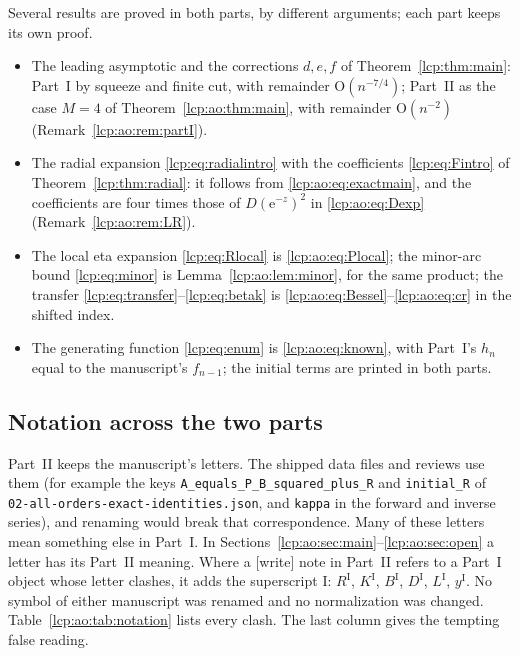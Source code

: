 \documentclass[11pt]{article}
\numberwithin{equation}{section}
\theoremstyle{definition}\newtheorem{definition}[theorem]{Definition}
\theoremstyle{remark}\newtheorem{remark}[theorem]{Remark}
\newcommand{\OO}{\mathrm O}
\newcommand{\ee}{\mathrm e}
\begin{document}
Several results are proved in both parts, by different arguments; each
part keeps its own proof.
\begin{itemize}[leftmargin=*,itemsep=0.15em]
\item The leading asymptotic and the corrections $d,e,f$ of
 Theorem~\ref{lcp:thm:main}: Part~I by squeeze and finite cut, with
 remainder $\OO(n^{-7/4})$; Part~II as the case $M=4$ of
 Theorem~\ref{lcp:ao:thm:main}, with remainder $\OO(n^{-2})$
 (Remark~\ref{lcp:ao:rem:partI}).
\item The radial expansion \eqref{lcp:eq:radialintro} with the
 coefficients \eqref{lcp:eq:Fintro} of Theorem~\ref{lcp:thm:radial}: it
 follows from \eqref{lcp:ao:eq:exactmain}, and the coefficients are four
 times those of $D(\ee^{-z})^2$ in \eqref{lcp:ao:eq:Dexp}
 (Remark~\ref{lcp:ao:rem:LR}).
\item The local eta expansion \eqref{lcp:eq:Rlocal} is
 \eqref{lcp:ao:eq:Plocal}; the minor-arc bound \eqref{lcp:eq:minor} is
 Lemma~\ref{lcp:ao:lem:minor}, for the same product; the transfer
 \eqref{lcp:eq:transfer}--\eqref{lcp:eq:betak} is
 \eqref{lcp:ao:eq:Bessel}--\eqref{lcp:ao:eq:cr} in the shifted index.
\item The generating function \eqref{lcp:eq:enum} is
 \eqref{lcp:ao:eq:known}, with Part~I's $h_n$ equal to the manuscript's
 $f_{n-1}$; the initial terms are printed in both parts.
\end{itemize}

\subsection{Notation across the two parts}\label{lcp:ao:sec:notation}
Part~II keeps the manuscript's letters. The shipped data files and reviews
use them (for example the keys \texttt{A\_equals\_P\_B\_squared\_plus\_R}
and \texttt{initial\_R} of \texttt{02-all-orders-exact-identities.json},
and \texttt{kappa} in the forward and inverse series), and renaming would
break that correspondence. Many of these letters mean something else in
Part~I. In Sections~\ref{lcp:ao:sec:main}--\ref{lcp:ao:sec:open} a letter
has its Part~II meaning. Where a \textsf{[write]} note in Part~II refers to
a Part~I object whose letter clashes, it adds the superscript
$\mathrm I$: $R^{\mathrm I}$, $K^{\mathrm I}$, $B^{\mathrm I}$,
$D^{\mathrm I}$, $L^{\mathrm I}$, $y^{\mathrm I}$. No symbol of either
manuscript was renamed and no normalization was changed.
Table~\ref{lcp:ao:tab:notation} lists every clash. The last column gives
the tempting false reading.
\end{document}
